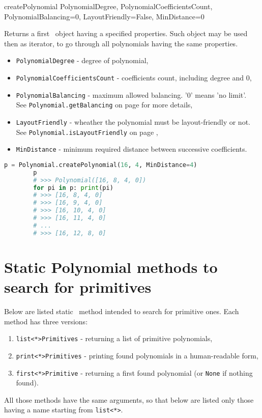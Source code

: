  {createPolynomial} {PolynomialDegree, PolynomialCoefficientsCount, PolynomialBalancing=0, LayoutFriendly=False, MinDistance=0} {
	Returns a first \Polynomial\ object having a specified properties. Such object may be used then as iterator, to go through all polynomials having the same properties.
	\begin{itemize}
		\item \texttt{PolynomialDegree} - degree of polynomial,
		\item \texttt{PolynomialCoefficientsCount} - coefficients count, including degree and 0,
		\item \texttt{PolynomialBalancing} - maximum allowed balancing. '0' means 'no limit'. \\See \texttt{Polynomial.getBalancing} on page \pageref{polynomial:getbalancing} for more details,
		\item \texttt{LayoutFriendly} - wheather the polynomial must be layout-friendly or not. \\See \texttt{Polynomial.isLayoutFriendly} on page \pageref{polynomial:islayoutfriendly},
		\item \texttt{MinDistance} - minimum required distance between successive coefficients.
	\end{itemize}
}
\begin{lstlisting}[language=Python]
		p = Polynomial.createPolynomial(16, 4, MinDistance=4)
		p
		# >>> Polynomial([16, 8, 4, 0])
		for pi in p: print(pi)
		# >>> [16, 8, 4, 0]
		# >>> [16, 9, 4, 0]
		# >>> [16, 10, 4, 0]
		# >>> [16, 11, 4, 0]
		# ...
		# >>> [16, 12, 8, 0]
\end{lstlisting}

\section{Static Polynomial methods to search for primitives}

Below are listed static \Polynomial\ method intended to search for primitive ones.
Each method has three versions:
\begin{enumerate}
	\item \texttt{list<*>Primitives} - returning a list of primitive polynomials,
	\item \texttt{print<*>Primitives} - printing found polynomials in a human-readable form,
	\item \texttt{first<*>Primitive} - returning a first found polynomial (or \texttt{None} if nothing found).
\end{enumerate}
All those methods have the same arguments, so that below are listed only those having a name starting from \texttt{list<*>}.

